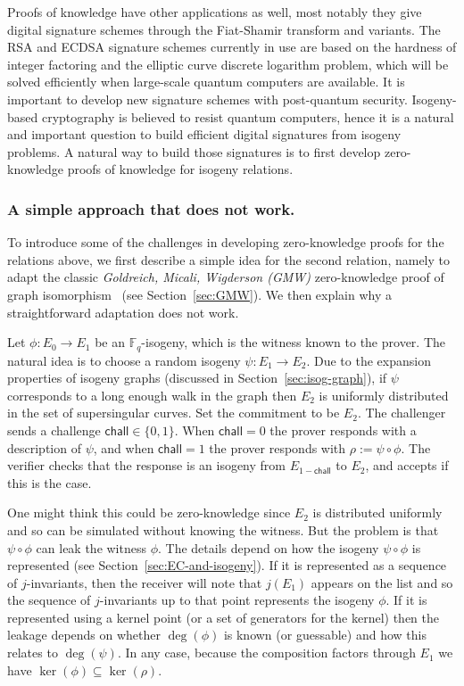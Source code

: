 \documentclass{llncs}
\newcommand{\chall}{\mathsf{chall}}
\newcommand{\F}{\ensuremath{\mathbb{F}}}
\begin{document}
Proofs of knowledge have other applications as well, most notably they give digital signature schemes through the Fiat-Shamir transform and variants. 
%
The RSA and ECDSA signature schemes currently in use are based on the hardness of integer factoring and the elliptic curve discrete logarithm problem, which will be solved efficiently when large-scale quantum computers are available.
It is important to develop new signature schemes with post-quantum security.
%
Isogeny-based cryptography is believed to resist quantum computers, hence it is a natural and important question to build efficient digital signatures from isogeny problems. A natural way to build those signatures is to first develop zero-knowledge proofs of knowledge for isogeny relations.









\subsubsection{A simple approach that does not work.}\label{sec:simple}


               
To introduce some of the challenges in developing zero-knowledge proofs for the relations above, we first describe a simple idea for the second relation, namely to adapt the classic \emph{Goldreich, Micali, Wigderson (GMW)} zero-knowledge proof of graph isomorphism~\cite{GMW} (see Section~\ref{sec:GMW}). We then explain why a straightforward adaptation does not work. 

Let $\phi : E_0 \to E_1$ be an $\F_q$-isogeny, which is the witness known to the prover.
The natural idea is to choose a random isogeny $\psi : E_1 \to E_2$.
Due to the expansion properties of isogeny graphs (discussed in Section~\ref{sec:isog-graph}), if $\psi$ corresponds to a long enough walk in the graph then $E_2$ is uniformly distributed in the set of supersingular curves.
Set the commitment to be $E_2$.
The challenger sends a challenge $\chall \in \{0,1\}$.
When $\chall = 0$ the prover responds with a description of $\psi$, and when $\chall=1$ the prover responds with $\rho := \psi \circ \phi$.
The verifier checks that the response is an isogeny from $E_{1-\chall}$ to $E_2$, and accepts if this is the case.

One might think this could be zero-knowledge since $E_2$ is distributed uniformly and so can be simulated without knowing the witness.
But the problem is that $\psi \circ \phi$ can leak the witness $\phi$.
The details depend on how the isogeny $\psi \circ \phi$ is represented (see Section~\ref{sec:EC-and-isogeny}). If it is represented as a sequence of $j$-invariants, then the receiver will note that $j(E_1)$ appears on the list and so the sequence of $j$-invariants up to that point represents the isogeny $\phi$.
If it is represented using a kernel point (or a set of generators for the kernel) then the leakage depends on whether $\deg(\phi)$ is known (or guessable) and how this relates to $\deg(\psi)$. In any case, because the composition factors through $E_1$ we have $\ker(\phi) \subseteq \ker( \rho )$.
\end{document}
